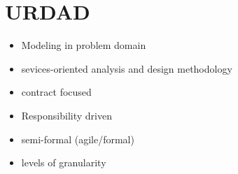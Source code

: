 \section{URDAD}

\begin{itemize}
  \item Modeling in problem domain
  \item sevices-oriented analysis and design methodology
  \item contract focused
  \item Responsibility driven
  \item semi-formal (agile/formal)
  \item levels of granularity 
\end{itemize}